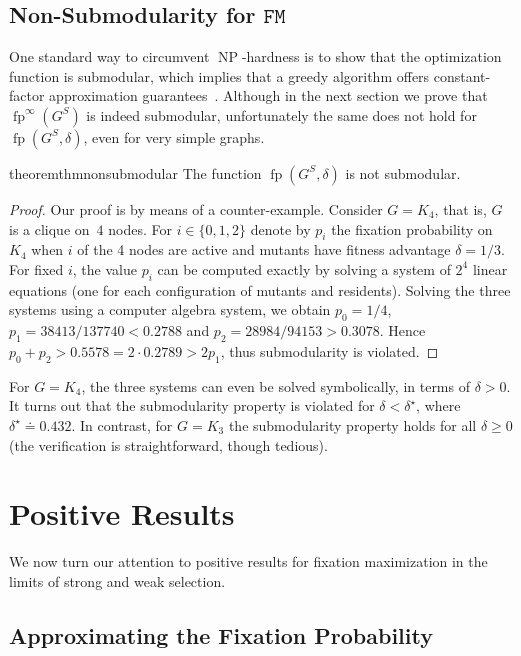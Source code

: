 \documentclass[letterpaper]{article}
\newcommand{\fp}{\operatorname{fp}}
\newcommand{\NodeActivationMoran}{\texttt{FM}}
\newcommand{\FitAdv}{\delta}
\newcommand{\NP}{\operatorname{NP}}
\begin{document}
\subsection{Non-Submodularity for $\NodeActivationMoran$}\label{subsec:non_submodularity}

One standard way to circumvent $\NP$-hardness is to show that the optimization function is submodular, which implies that a greedy algorithm offers constant-factor approximation guarantees~\cite{Nemhauser1978,Krause2014}. Although in the next section we prove that $\fp^\infty(G^S)$ is indeed submodular, unfortunately the same does not hold for $\fp(G^S, \FitAdv)$, even for very simple graphs.

\begin{restatable}{theorem}{thmnonsubmodular}\label{thm:non_submodular}
The function $\fp(G^S,\FitAdv)$ is not submodular.
\end{restatable}
\begin{proof}
Our proof is by means of a counter-example.
Consider $G=K_{4}$, that is, $G$ is a clique on~$4$ nodes.
For $i\in\{0,1,2\}$ denote by $p_i$ the fixation probability on $K_4$ when $i$ of the 4 nodes are active and mutants have fitness advantage $\FitAdv=1/3$.
For fixed $i$, the value $p_i$ can be computed exactly
by solving a system of $2^4$ linear equations (one for each configuration of mutants and residents).
Solving the three systems using a computer algebra system, we obtain $p_0=1/4$, $p_1=38413/137740<0.2788$ and $p_2=28984/94153>0.3078$.
Hence $p_0+p_2>0.5578=2\cdot 0.2789>2p_1$, thus submodularity is violated.
\end{proof}

For $G=K_4$, the three systems can even be solved symbolically, in terms of $\FitAdv>0$. It turns out that the submodularity property is violated for $\FitAdv<\delta^\star$, where $\delta^\star\doteq 0.432$. In contrast, for $G=K_3$ the submodularity property holds for all $\FitAdv\ge 0$ (the verification is straightforward, though tedious).




\section{Positive Results}\label{sec:positive}
We now turn our attention to positive results for fixation maximization in the limits of strong and weak selection.


\subsection{Approximating the Fixation Probability}\label{subsec:approx}
\end{document}
